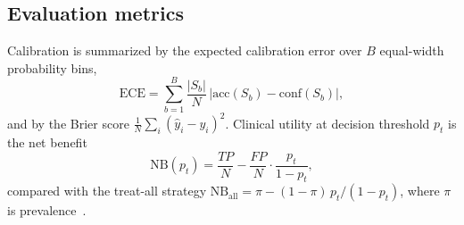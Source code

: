 \documentclass[journal]{IEEEtran}
\begin{document}
\subsection{Evaluation metrics}
Calibration is summarized by the expected calibration error over $B$ equal-width probability bins,
\begin{equation}
\mathrm{ECE}=\sum_{b=1}^{B}\frac{|S_b|}{N}\,\bigl|\mathrm{acc}(S_b)-\mathrm{conf}(S_b)\bigr|,
\end{equation}
and by the Brier score $\frac{1}{N}\sum_i(\hat y_i-y_i)^2$. Clinical utility at decision threshold $p_t$ is the net benefit
\begin{equation}
\mathrm{NB}(p_t)=\frac{TP}{N}-\frac{FP}{N}\cdot\frac{p_t}{1-p_t},
\end{equation}
compared with the treat-all strategy $\mathrm{NB}_{\mathrm{all}}=\pi-(1-\pi)\,p_t/(1-p_t)$, where $\pi$ is prevalence~\cite{vickers2006}.

\end{document}
